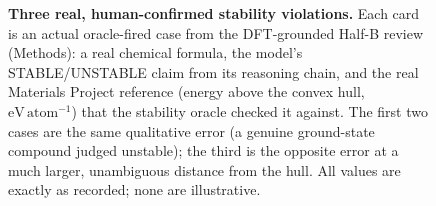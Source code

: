 \begin{figure}[t]
\caption{\textbf{Three real, human-confirmed stability violations.} Each card is an actual
oracle-fired case from the DFT-grounded Half-B review (Methods): a real chemical formula,
the model's STABLE/UNSTABLE claim from its reasoning chain, and the real Materials
Project reference (energy above the convex hull, $\mathrm{eV\,atom^{-1}}$) that the
stability oracle checked it against. The first two cases are the same qualitative error
(a genuine ground-state compound judged unstable); the third is the opposite error at a
much larger, unambiguous distance from the hull. All values are exactly as recorded;
none are illustrative.}
\label{fig:stability-cases}
\end{figure}


